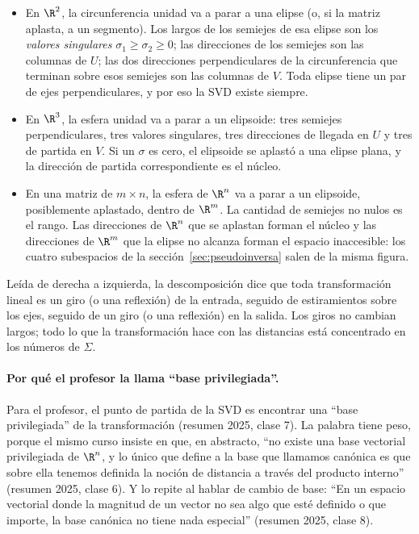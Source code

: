 \begin{itemize}
  \item En \(\R^2\), la circunferencia unidad va a parar a una elipse (o, si la matriz
  aplasta, a un segmento). Los largos de los semiejes de esa elipse son los \emph{valores
  singulares} \(\sigma_1\ge\sigma_2\ge0\); las direcciones de los semiejes son las columnas
  de \(U\); las dos direcciones perpendiculares de la circunferencia que terminan sobre esos
  semiejes son las columnas de \(V\). Toda elipse tiene un par de ejes perpendiculares, y
  por eso la SVD existe siempre.
  \item En \(\R^3\), la esfera unidad va a parar a un elipsoide: tres semiejes
  perpendiculares, tres valores singulares, tres direcciones de llegada en \(U\) y tres de
  partida en \(V\). Si un \(\sigma\) es cero, el elipsoide se aplastó a una elipse plana, y
  la dirección de partida correspondiente es el núcleo.
  \item En una matriz de \(m\times n\), la esfera de \(\R^n\) va a parar a un elipsoide,
  posiblemente aplastado, dentro de \(\R^m\). La cantidad de semiejes no nulos es el rango.
  Las direcciones de \(\R^n\) que se aplastan forman el núcleo y las direcciones de
  \(\R^m\) que la elipse no alcanza forman el espacio inaccesible: los cuatro subespacios
  de la sección~\ref{sec:pseudoinversa} salen de la misma figura.
\end{itemize}

Leída de derecha a izquierda, la descomposición dice que toda transformación lineal es un
giro (o una reflexión) de la entrada, seguido de estiramientos sobre los ejes, seguido de un
giro (o una reflexión) en la salida. Los giros no cambian largos; todo lo que la
transformación hace con las distancias está concentrado en los números de \(\Sigma\).

\paragraph{Por qué el profesor la llama ``base privilegiada''.} Para el profesor, el punto
de partida de la SVD es encontrar una ``base privilegiada'' de la transformación (resumen
2025, clase 7). La palabra tiene peso, porque el mismo curso insiste en que, en abstracto,
``no existe una base vectorial privilegiada de \(\R^n\), y lo único que define a la base que
llamamos canónica es que sobre ella tenemos definida la noción de distancia a través del
producto interno'' (resumen 2025, clase 6). Y lo repite al hablar de cambio de base: ``En un
espacio vectorial donde la magnitud de un vector no sea algo que esté definido o que
importe, la base canónica no tiene nada especial'' (resumen 2025, clase 8).

